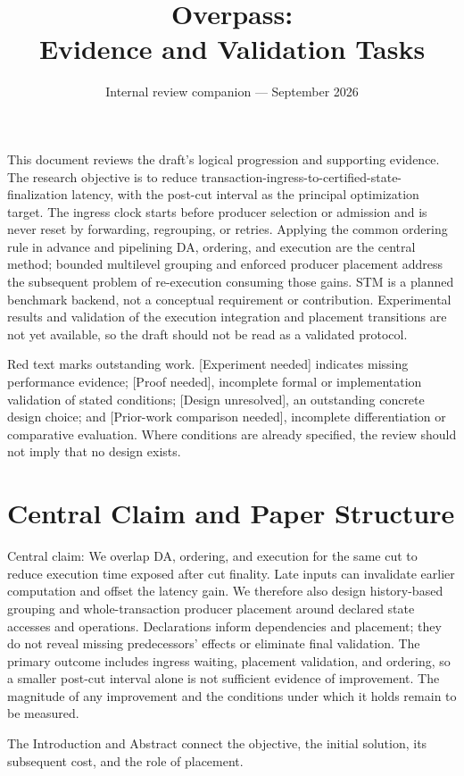\documentclass[11pt]{article}
\title{Overpass:\\Evidence and Validation Tasks}
\author{}
\date{\small Internal review companion --- September 2026}
\begin{document}
\maketitle
\thispagestyle{empty}
This document reviews the draft's logical progression and supporting evidence. The research objective is to reduce transaction-ingress-to-certified-state-finalization latency, with the post-cut interval as the principal optimization target. The ingress clock starts before producer selection or admission and is never reset by forwarding, regrouping, or retries. Applying the common ordering rule in advance and pipelining DA, ordering, and execution are the central method; bounded multilevel grouping and enforced producer placement address the subsequent problem of re-execution consuming those gains. STM is a planned benchmark backend, not a conceptual requirement or contribution. Experimental results and validation of the execution integration and placement transitions are not yet available, so the draft should not be read as a validated protocol.

Red text marks outstanding work. [Experiment needed] indicates missing performance evidence; [Proof needed], incomplete formal or implementation validation of stated conditions; [Design unresolved], an outstanding concrete design choice; and [Prior-work comparison needed], incomplete differentiation or comparative evaluation. Where conditions are already specified, the review should not imply that no design exists.

\section{Central Claim and Paper Structure}

Central claim: We overlap DA, ordering, and execution for the same cut to reduce execution time exposed after cut finality. Late inputs can invalidate earlier computation and offset the latency gain. We therefore also design history-based grouping and whole-transaction producer placement around declared state accesses and operations. Declarations inform dependencies and placement; they do not reveal missing predecessors' effects or eliminate final validation. The primary outcome includes ingress waiting, placement validation, and ordering, so a smaller post-cut interval alone is not sufficient evidence of improvement. The magnitude of any improvement and the conditions under which it holds remain to be measured.

The Introduction and Abstract connect the objective, the initial solution, its subsequent cost, and the role of placement.
\end{document}
